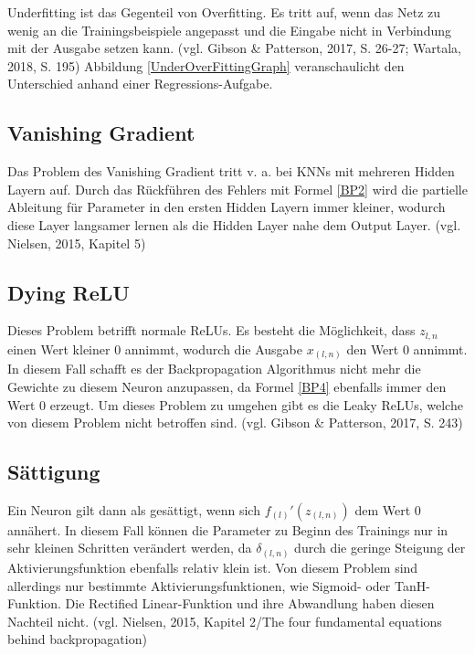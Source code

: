 \documentclass[a4paper,12pt,ngerman,oneside]{scrreprt}	%
\newcommand{\practitioner}[1]{(vgl. Gibson \& Patterson, 2017, S. {#1})}
\begin{document}
			Underfitting ist das Gegenteil von Overfitting. Es tritt auf, wenn das Netz zu wenig an die Trainingsbeispiele angepasst und die Eingabe nicht in Verbindung mit der Ausgabe setzen kann. \practitioner{26-27; Wartala, 2018, S. 195} Abbildung \ref{UnderOverFittingGraph} veranschaulicht den Unterschied anhand einer Regressions-Aufgabe. 
			
			\subsection{Vanishing Gradient}\label{VanishingGradient}
			Das Problem des Vanishing Gradient tritt v. a. bei KNNs mit mehreren Hidden Layern auf. Durch das Rückführen des Fehlers mit Formel \ref{BP2} wird die partielle Ableitung für Parameter in den ersten Hidden Layern immer kleiner, wodurch diese Layer langsamer lernen als die Hidden Layer nahe dem Output Layer. (vgl. Nielsen, 2015, Kapitel 5)
			
			\subsection{Dying ReLU}\label{DyingReLU}
			Dieses Problem betrifft normale ReLUs. Es besteht die Möglichkeit, dass $z_{l,n}$ einen Wert kleiner 0 annimmt, wodurch die Ausgabe $x_{(l,n)}$ den Wert 0 annimmt. In diesem Fall schafft es der Backpropagation Algorithmus nicht mehr die Gewichte zu diesem Neuron anzupassen, da Formel \ref{BP4} ebenfalls immer den Wert 0 erzeugt. Um dieses Problem zu umgehen gibt es die Leaky ReLUs, welche von diesem Problem nicht betroffen sind. \practitioner{243}
			\subsection{Sättigung}\label{Sättigung}
			Ein Neuron gilt dann als gesättigt, wenn sich $f_{(l)}\prime(z_{(l,n)})$ dem Wert 0 annähert. In diesem Fall können die Parameter zu Beginn des Trainings nur in sehr kleinen Schritten verändert werden, da $\delta_{(l,n)}$ durch die geringe Steigung der Aktivierungsfunktion ebenfalls relativ klein ist. Von diesem Problem sind allerdings nur bestimmte Aktivierungsfunktionen, wie Sigmoid- oder TanH-Funktion. Die Rectified Linear-Funktion und ihre Abwandlung haben diesen Nachteil nicht. (vgl. Nielsen, 2015, Kapitel 2/The four fundamental equations behind backpropagation)
			
\end{document}

